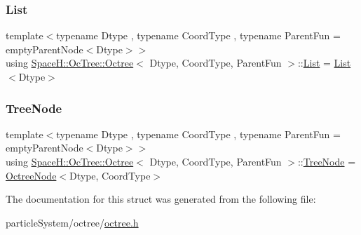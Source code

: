 \mbox{\label{struct_space_h_1_1_oc_tree_1_1_octree_a0a18ebc4ba2cd75e96390866501d4c4a}} 
\subsubsection{\texorpdfstring{List}{List}}
{\footnotesize\ttfamily template$<$typename Dtype , typename Coord\+Type , typename Parent\+Fun  = empty\+Parent\+Node$<$\+Dtype$>$$>$ \\
using \mbox{\hyperlink{struct_space_h_1_1_oc_tree_1_1_octree}{Space\+H\+::\+Oc\+Tree\+::\+Octree}}$<$ Dtype, Coord\+Type, Parent\+Fun $>$\+::\mbox{\hyperlink{struct_space_h_1_1_oc_tree_1_1_octree_a0a18ebc4ba2cd75e96390866501d4c4a}{List}} =  \mbox{\hyperlink{struct_space_h_1_1_oc_tree_1_1_octree_a0a18ebc4ba2cd75e96390866501d4c4a}{List}}$<$Dtype$>$}

\mbox{\label{struct_space_h_1_1_oc_tree_1_1_octree_a5f0a7881da3fe77ffa83c83283202917}} 
\subsubsection{\texorpdfstring{Tree\+Node}{TreeNode}}
{\footnotesize\ttfamily template$<$typename Dtype , typename Coord\+Type , typename Parent\+Fun  = empty\+Parent\+Node$<$\+Dtype$>$$>$ \\
using \mbox{\hyperlink{struct_space_h_1_1_oc_tree_1_1_octree}{Space\+H\+::\+Oc\+Tree\+::\+Octree}}$<$ Dtype, Coord\+Type, Parent\+Fun $>$\+::\mbox{\hyperlink{struct_space_h_1_1_oc_tree_1_1_octree_a5f0a7881da3fe77ffa83c83283202917}{Tree\+Node}} =  \mbox{\hyperlink{struct_space_h_1_1_oc_tree_1_1_octree_node}{Octree\+Node}}$<$Dtype, Coord\+Type$>$}



The documentation for this struct was generated from the following file\+:\begin{DoxyCompactItemize}
\item 
particle\+System/octree/\mbox{\hyperlink{octree_8h}{octree.\+h}}\end{DoxyCompactItemize}
